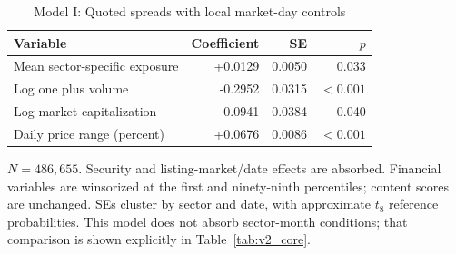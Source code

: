 \begin{table}[htbp]\centering\footnotesize
\caption{Model I: Quoted spreads with local market-day controls}
\label{tab:v2_full_modelI}\begin{threeparttable}
\begin{tabular}{l r r r}\toprule Variable & Coefficient & SE & $p$ \\\midrule
Mean sector-specific exposure & +0.0129 & 0.0050 & 0.033 \\
Log one plus volume & -0.2952 & 0.0315 & $<0.001$ \\
Log market capitalization & -0.0941 & 0.0384 & 0.040 \\
Daily price range (percent) & +0.0676 & 0.0086 & $<0.001$ \\
\bottomrule\end{tabular}
\begin{tablenotes}\small\item $N=486{,}655$. Security and listing-market/date effects are absorbed. Financial variables are winsorized at the first and ninety-ninth percentiles; content scores are unchanged. SEs cluster by sector and date, with approximate $t_8$ reference probabilities. This model does not absorb sector-month conditions; that comparison is shown explicitly in Table~\ref{tab:v2_core}.\end{tablenotes}
\end{threeparttable}\end{table}
